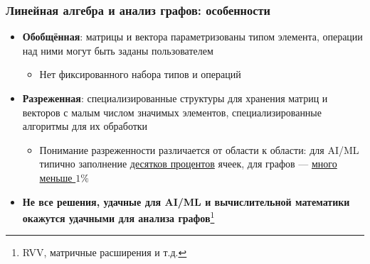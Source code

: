 \documentclass[xcolor=table,aspectratio=169]{beamer}
\begin{document}
\begin{frame}[fragile]
  \frametitle{Линейная алгебра и анализ графов: особенности}
  
    \begin{itemize}
      \item \textbf{Обобщённая}: матрицы и вектора параметризованы типом элемента, операции над ними могут быть заданы пользователем
        \begin{itemize}
          \item Нет фиксированного набора типов и операций
        \end{itemize}
      \item \textbf{Разреженная}: специализированные структуры для хранения матриц и векторов с малым числом значимых элементов, специализированные алгоритмы для их обработки 
      \begin{itemize}
          \item Понимание разреженности различается от области к области: для AI/ML типично заполнение \underline{десятков процентов} ячеек, для графов --- \underline{много меньше $1\%$}        
        \end{itemize}
        \item \textbf{Не все решения, удачные для AI/ML и вычислительной математики окажутся удачными для анализа графов}\footnote{RVV, матричные расширения и т.д.}
    \end{itemize}
\end{frame}
\end{document}
